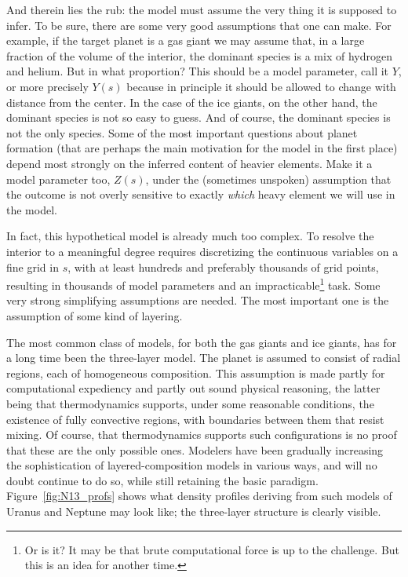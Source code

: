 And therein lies the rub: the model must assume the very thing it is supposed to
infer. To be sure, there are some very good assumptions that one can make. For
example, if the target planet is a gas giant we may assume that, in a large
fraction of the volume of the interior, the dominant species is a mix of
hydrogen and helium. But in what proportion? This should be a model parameter,
call it $Y$, or more precisely $Y(s)$ because in principle it should be allowed
to change with distance from the center. In the case of the ice giants, on the
other hand, the dominant species is not so easy to guess. And of course, the
dominant species is not the only species. Some of the most important questions
about planet formation (that are perhaps the main motivation for the model in
the first place) depend most strongly on the inferred content of heavier
elements. Make it a model parameter too, $Z(s)$, under the (sometimes unspoken)
assumption that the outcome is not overly sensitive to exactly \emph{which}
heavy element we will use in the model.

In fact, this hypothetical model is already much too complex. To resolve the
interior to a meaningful degree requires discretizing the continuous variables
on a fine grid in $s$, with at least hundreds and preferably thousands of grid
points, resulting in thousands of model parameters and an
impracticable\footnote{Or is it? It may be that brute computational force is up
to the challenge. But this is an idea for another time.} task. Some very strong
simplifying assumptions are needed. The most important one is the assumption of
some kind of layering.

The most common class of models, for both the gas giants and ice giants, has for
a long time been the three-layer model. The planet is assumed to consist of
radial regions, each of homogeneous composition. This assumption is made partly
for computational expediency and partly out sound physical reasoning, the latter
being that thermodynamics supports, under some reasonable conditions, the
existence of fully convective regions, with boundaries between them that resist
mixing. Of course, that thermodynamics supports such configurations is no proof
that these are the only possible ones. Modelers have been gradually increasing
the sophistication of layered-composition models in various ways, and will no
doubt continue to do so, while still retaining the basic paradigm.
Figure~\ref{fig:N13_profs} shows what density profiles deriving from such models
of Uranus and Neptune \citep{Nettelmann2013b} may look like; the three-layer
structure is clearly visible.

